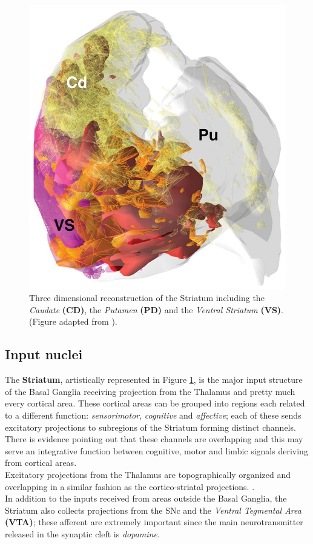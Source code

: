 \documentclass[MSc,english]{Container/thesistemplate}
\begin{document}
\begin{figure}[ht!]
  \centering
    \includegraphics[scale=.8]{Images/striatumrec.jpg}
    \caption{Three dimensional reconstruction of the Striatum including the \emph{Caudate} \textbf{(CD)}, the \emph{Putamen} \textbf{(PD)} and the \emph{Ventral Striatum} \textbf{(VS)}. (Figure adapted from \cite{striatalfigure}).}
    \label{fig:striatum3d}
\end{figure}

\subsection*{Input nuclei}
The \textbf{Striatum}, artistically represented in Figure \ref{fig:striatum3d}, is the major input structure of the Basal Ganglia receiving projection from the Thalamus and pretty much every cortical area. These cortical areas can be grouped into regions each related to a different function: \emph{sensorimotor}, \emph{cognitive} and \emph{affective}; each of these sends excitatory projections to subregions of the Striatum forming distinct channels. There is evidence pointing out that these channels are overlapping and this may serve an integrative function between cognitive, motor and limbic signals deriving from cortical areas. 
\\  Excitatory projections from the Thalamus are topographically organized and overlapping in a similar fashion as the cortico-striatal projections. \cite{nelsonkreitzer}.
\\ In addition to the inputs received from areas outside the Basal Ganglia, the Striatum also collects projections from the SNc and the \emph{Ventral Tegmental Area} \textbf{(VTA)}; these afferent are extremely important since the main neurotransmitter released in the synaptic cleft is \emph{dopamine}. 
\end{document}

